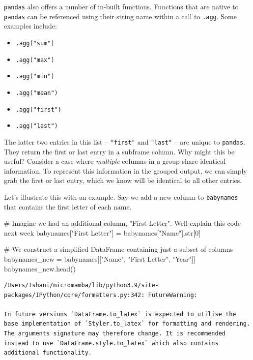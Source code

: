 \documentclass[
  letterpaper,
  DIV=11,
  numbers=noendperiod]{scrreprt}
\newenvironment{Shaded}{\begin{snugshade}}{\end{snugshade}}
\newcommand{\BuiltInTok}[1]{\textcolor[rgb]{0.00,0.23,0.31}{#1}}
\newcommand{\CommentTok}[1]{\textcolor[rgb]{0.37,0.37,0.37}{#1}}
\newcommand{\DecValTok}[1]{\textcolor[rgb]{0.68,0.00,0.00}{#1}}
\newcommand{\NormalTok}[1]{\textcolor[rgb]{0.00,0.23,0.31}{#1}}
\newcommand{\OperatorTok}[1]{\textcolor[rgb]{0.37,0.37,0.37}{#1}}
\newcommand{\StringTok}[1]{\textcolor[rgb]{0.13,0.47,0.30}{#1}}
\providecommand{\tightlist}{%
  \setlength{\itemsep}{0pt}\setlength{\parskip}{0pt}}\usepackage{longtable,booktabs,array}
\begin{document}
\texttt{pandas} also offers a number of in-built functions. Functions
that are native to \texttt{pandas} can be referenced using their string
name within a call to \texttt{.agg}. Some examples include:

\begin{itemize}
\tightlist
\item
  \texttt{.agg("sum")}
\item
  \texttt{.agg("max")}
\item
  \texttt{.agg("min")}
\item
  \texttt{.agg("mean")}
\item
  \texttt{.agg("first")}
\item
  \texttt{.agg("last")}
\end{itemize}

The latter two entries in this list -- \texttt{"first"} and
\texttt{"last"} -- are unique to \texttt{pandas}. They return the first
or last entry in a subframe column. Why might this be useful? Consider a
case where \emph{multiple} columns in a group share identical
information. To represent this information in the grouped output, we can
simply grab the first or last entry, which we know will be identical to
all other entries.

Let's illustrate this with an example. Say we add a new column to
\texttt{babynames} that contains the first letter of each name.

\begin{Shaded}
\begin{Highlighting}[]
\CommentTok{\# Imagine we had an additional column, "First Letter". We\textquotesingle{}ll explain this code next week}
\NormalTok{babynames[}\StringTok{"First Letter"}\NormalTok{] }\OperatorTok{=}\NormalTok{ babynames[}\StringTok{"Name"}\NormalTok{].}\BuiltInTok{str}\NormalTok{[}\DecValTok{0}\NormalTok{]}

\CommentTok{\# We construct a simplified DataFrame containing just a subset of columns}
\NormalTok{babynames\_new }\OperatorTok{=}\NormalTok{ babynames[[}\StringTok{"Name"}\NormalTok{, }\StringTok{"First Letter"}\NormalTok{, }\StringTok{"Year"}\NormalTok{]]}
\NormalTok{babynames\_new.head()}
\end{Highlighting}
\end{Shaded}

\begin{verbatim}
/Users/Ishani/micromamba/lib/python3.9/site-packages/IPython/core/formatters.py:342: FutureWarning:

In future versions `DataFrame.to_latex` is expected to utilise the base implementation of `Styler.to_latex` for formatting and rendering. The arguments signature may therefore change. It is recommended instead to use `DataFrame.style.to_latex` which also contains additional functionality.
\end{verbatim}
\end{document}

